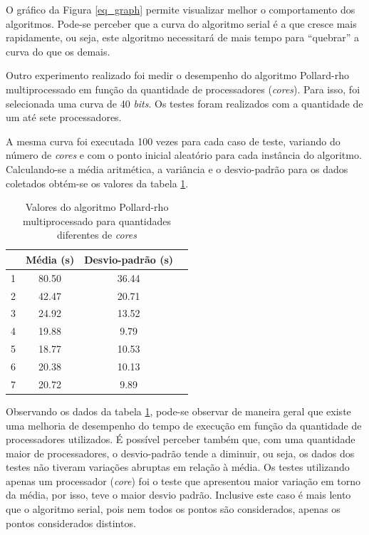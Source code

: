 O gráfico da Figura \ref{eq_graph} permite visualizar melhor o comportamento dos algoritmos. Pode-se perceber que a curva do algoritmo serial é a que cresce mais rapidamente, ou seja, este algoritmo necessitará de mais tempo para ``quebrar'' a curva do que os demais.

Outro experimento realizado foi medir o desempenho do algoritmo Pollard-rho multiprocessado em função da quantidade de processadores (\textit{cores}). Para isso, foi selecionada uma curva de 40 \textit{bits}. Os testes foram realizados com a quantidade de um até sete processadores.

A mesma curva foi executada 100 vezes para cada caso de teste, variando do número de \textit{cores} e com o ponto inicial aleatório para cada instância do algoritmo. Calculando-se a média aritmética, a variância e o desvio-padrão para os dados coletados obtém-se os valores da tabela \ref{table:estatistica_mproc}.

\begin{table}[h]
\centering
\begin{tabular}{|c|c|c|c|}
\hline
\rowcolor[gray]{0.9}
\multicolumn{1}{|c|}{
\textbf{\textit{Cores}}} & \textbf{Média (s)} & \textbf{Desvio-padrão (s)} \\ \hline
1                        & 80.50              & 36.44                      \\ \hline
2                        & 42.47              & 20.71                      \\ \hline
3                        & 24.92              & 13.52                      \\ \hline
4                        & 19.88              &  9.79                      \\ \hline
5                        & 18.77              & 10.53                      \\ \hline
6                        & 20.38              & 10.13                      \\ \hline
7                        & 20.72              &  9.89                      \\ \hline
\end{tabular}
\caption{Valores do algoritmo Pollard-rho multiprocessado para quantidades diferentes de \textit{cores}}
\label{table:estatistica_mproc}
\end{table}

Observando os dados da tabela \ref{table:estatistica_mproc}, pode-se observar de maneira geral que existe uma melhoria de desempenho do tempo de execução em função da quantidade de processadores utilizados. É possível perceber também que, com uma quantidade maior de processadores, o desvio-padrão tende a diminuir, ou seja, os dados dos testes não tiveram variações abruptas em relação à média. Os testes utilizando apenas um processador (\textit{core}) foi o teste que apresentou maior variação em torno da média, por isso, teve o maior desvio padrão. Inclusive este caso é mais lento que o algoritmo serial, pois nem todos os pontos são considerados, apenas os pontos considerados distintos.

